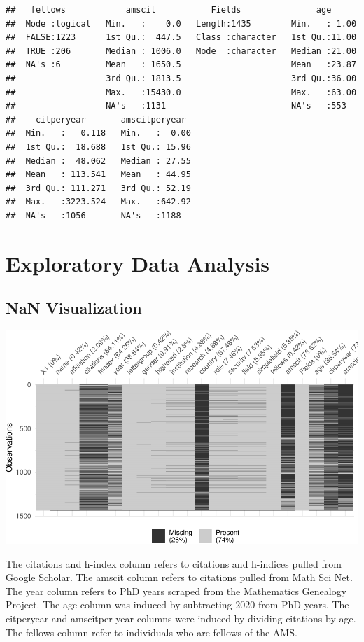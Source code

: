 \documentclass[]{article}
\begin{document}
\begin{verbatim}
##   fellows            amscit           Fields               age       
##  Mode :logical   Min.   :    0.0   Length:1435        Min.   : 1.00  
##  FALSE:1223      1st Qu.:  447.5   Class :character   1st Qu.:11.00  
##  TRUE :206       Median : 1006.0   Mode  :character   Median :21.00  
##  NA's :6         Mean   : 1650.5                      Mean   :23.87  
##                  3rd Qu.: 1813.5                      3rd Qu.:36.00  
##                  Max.   :15430.0                      Max.   :63.00  
##                  NA's   :1131                         NA's   :553    
##    citperyear       amscitperyear   
##  Min.   :   0.118   Min.   :  0.00  
##  1st Qu.:  18.688   1st Qu.: 15.96  
##  Median :  48.062   Median : 27.55  
##  Mean   : 113.541   Mean   : 44.95  
##  3rd Qu.: 111.271   3rd Qu.: 52.19  
##  Max.   :3223.524   Max.   :642.92  
##  NA's   :1056       NA's   :1188
\end{verbatim}

\hypertarget{exploratory-data-analysis}{%
\section{Exploratory Data Analysis}\label{exploratory-data-analysis}}

\hypertarget{nan-visualization}{%
\subsection{NaN Visualization}\label{nan-visualization}}

\includegraphics{final_files/figure-latex/unnamed-chunk-3-1.pdf}

The citations and h-index column refers to citations and h-indices
pulled from Google Scholar. The amscit column refers to citations pulled
from Math Sci Net. The year column refers to PhD years scraped from the
Mathematics Genealogy Project. The age column was induced by subtracting
2020 from PhD years. The citperyear and amscitper year columns were
induced by dividing citations by age. The fellows column refer to
individuals who are fellows of the AMS.
\end{document}
